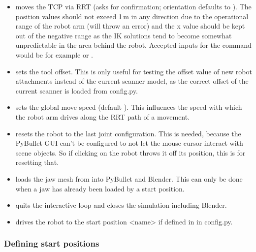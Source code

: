 \begin{itemize}[leftmargin=*]
    \item {} moves the TCP via RRT (asks for confirmation; orientation defaults to ). The position values should not exceed 1\,m in any direction due to the operational range of the robot arm (will throw an error) and the x value should be kept out of the negative range as the IK solutions tend to become somewhat unpredictable in the area behind the robot. Accepted inputs for the command would be for example  or .
    \item {} sets the tool offset. This is only useful for testing the offset value of new robot attachments instead of the current scanner model, as the correct offset of the current scanner is loaded from config.py.
    \item {} sets the global move speed (default ). This influences the speed with which the robot arm drives along the RRT path of a movement.
    \item {} resets the robot to the last joint configuration. This is needed, because the PyBullet GUI can't be configured to not let the mouse cursor interact with scene objects. So if clicking on the robot throws it off its position, this is for resetting that.
    \item {} loads the jaw mesh from  into PyBullet and Blender. This can only be done when a jaw has already been loaded by a start position.
    \item {} quits the interactive loop and closes the simulation including Blender.
    \item {} drives the robot to the start position <name> if defined in  in config.py.
\end{itemize}

\subsubsection{Defining start positions}\label{ms:start-positions}

